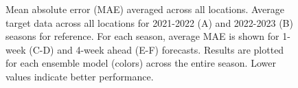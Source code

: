 \documentclass[
  article,
  shortnames,
  notitle]{jss}
\begin{document}
\begin{figure}


\caption{\label{fig-mae-vs-forecast-date}Mean absolute error (MAE)
averaged across all locations. Average target data across all locations
for 2021-2022 (A) and 2022-2023 (B) seasons for reference. For each
season, average MAE is shown for 1-week (C-D) and 4-week ahead (E-F)
forecasts. Results are plotted for each ensemble model (colors) across
the entire season. Lower values indicate better performance.}

\end{figure}%
\end{document}
